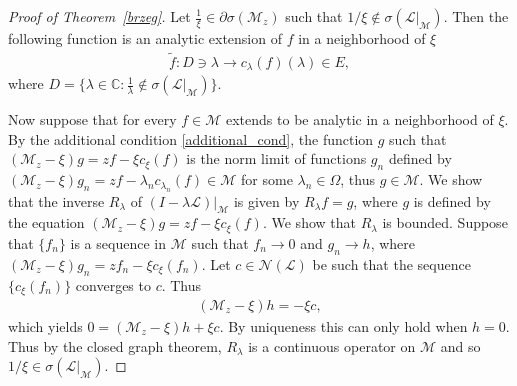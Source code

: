 \documentclass[reqno]{amsproc}
\numberwithin{equation}{section}
\theoremstyle{remark}
\newcommand*{\mcal}{\mathcal{M}}
\newcommand*{\nul}{\mathscr{N}}
\newcommand*{\comp}{\mathbb{C}}
\theoremstyle{definition}
\newcommand{\lein}{\mathcal{L}}
\newcommand{\mul}{\mathcal{M}_z}
\begin{document}
\begin{proof}[Proof of Theorem~\ref{brzeg}]

   Let $\frac{1}{\xi}\in \partial \sigma(\mul)$ such that $1/{\xi}\notin \sigma(\lein|_\mcal)$.
Then the following function is an analytic extension of $f$ in a neighborhood
of $\xi$
\begin{align*}
\tilde{f} \colon D\ni\lambda \to c_\lambda(f)(\lambda)\in E,
\end{align*}
where $D = \{ \lambda \in \comp \colon \frac{1}{\lambda} \notin \sigma(\lein|_\mcal)\}$. 

 Now suppose that for every  $f \in \mcal$  extends to be analytic in a neighborhood of  $\xi$. By the additional condition \eqref{additional_cond}, the function $g$ such that $(\mul-\xi)g=zf-\xi c_\xi(f)$
  is the norm limit of functions $g_n$ defined by 
  $(\mul-\xi)g_n=zf-\lambda_n c_{\lambda_n}(f)\in\mcal$
  for some $\lambda_n\in \varOmega$, thus $g\in \mcal$. We show that the inverse $R_\lambda$ of  $(I-\lambda\lein)|_\mcal$ is given by $R_\lambda f=g$, where $g$ is defined by the equation $ (\mul-\xi)g=zf-\xi c_\xi(f)$. We show that $R_\lambda$ is bounded.
   Suppose that $\{f_n\}$ is a sequence in $\mcal$ such that 
   $f_n \to 0$  and  $g_n\to h$,
   where $(\mul-\xi)g_n=zf_n-\xi c_\xi(f_n)$.
 Let $c\in\nul(\lein)$ be such that
 the sequence $\{c_\xi(f_n)\}$ converges to $c$.
 Thus
 \begin{align*}
  (\mul-\xi)h= -\xi c,
 \end{align*}
 which yields $0=(\mul-\xi)h+\xi c$. By uniqueness this 
 can only hold when $h = 0$.
 Thus by the closed graph theorem, $R_\lambda$ is a continuous operator on $\mcal$ and so $1/\xi\in \sigma(\lein|_\mcal)$.
\end{proof}
   
\end{document}
